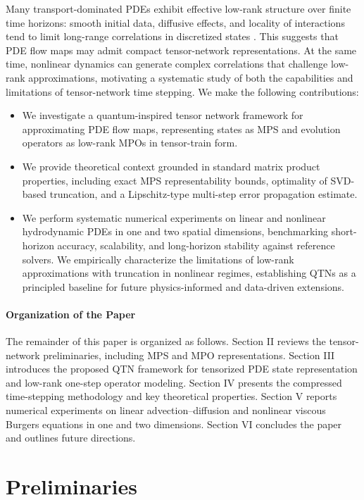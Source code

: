 \documentclass[letterpaper, 10 pt, conference]{ieeeconf}  %
\begin{document}
Many transport-dominated PDEs exhibit effective low-rank structure over finite
time horizons: smooth initial data, diffusive effects, and locality of interactions
tend to limit long-range correlations in discretized states \cite{Peddinti2024CFD,Gourianov2022Turbulence,Kiffner2023ROM}. This suggests that
PDE flow maps may admit compact tensor-network representations. At the same time,
nonlinear dynamics can generate complex correlations that challenge low-rank
approximations, motivating a systematic study of both the capabilities and limitations
of tensor-network time stepping.
We make the following contributions:
\begin{itemize}
\item We investigate a quantum-inspired tensor network framework
for approximating PDE flow maps, representing states as MPS and
evolution operators as low-rank MPOs in tensor-train form.
\item We provide theoretical context grounded in standard matrix product
properties, including exact MPS representability bounds, optimality of SVD-based truncation, and a Lipschitz-type multi-step error propagation estimate.
\item We perform systematic numerical experiments on linear and nonlinear
hydrodynamic PDEs in one and two spatial dimensions, benchmarking short-horizon accuracy, scalability, and long-horizon stability against reference solvers. We empirically characterize the limitations of low-rank approximations with truncation in nonlinear regimes, establishing QTNs as a principled
baseline for future physics-informed and data-driven extensions.
\end{itemize}

\paragraph*{Organization of the Paper} The remainder of this paper is organized as follows. Section II reviews the tensor-network preliminaries, including MPS and MPO representations. Section III introduces the proposed QTN framework for tensorized PDE state representation and low-rank one-step operator modeling. Section IV presents the compressed time-stepping methodology and key theoretical properties. Section V reports numerical experiments on linear advection–diffusion and nonlinear viscous Burgers equations in one and two dimensions. Section VI concludes the paper and outlines future directions.


\section{Preliminaries}
\label{sec:preliminaries}
\end{document}
